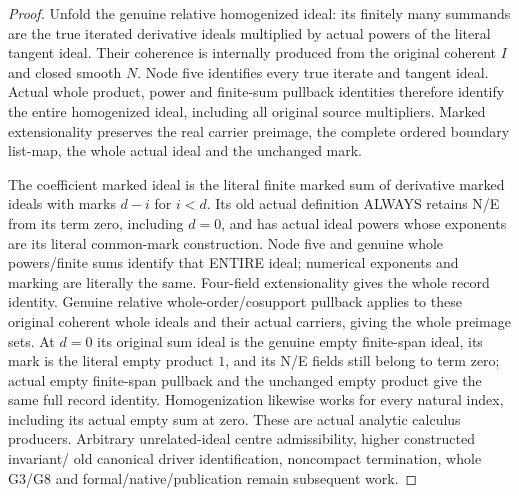 \begin{proof}
Unfold the genuine relative homogenized ideal: its finitely many summands
are the true iterated derivative ideals multiplied by actual powers of the
literal tangent ideal. Their coherence is internally produced from the
original coherent $I$ and closed smooth $N$. Node five identifies every true
iterate and tangent ideal. Actual whole product, power and finite-sum
pullback identities therefore identify the entire homogenized ideal, including
all original source multipliers. Marked extensionality preserves the real
carrier preimage, the complete ordered boundary list-map, the whole actual
ideal and the unchanged mark.

The coefficient marked ideal is the literal finite marked sum of derivative
marked ideals with marks $d-i$ for $i<d$. Its old actual definition ALWAYS
retains N/E from its term zero, including $d=0$, and has actual ideal powers
whose exponents are its literal common-mark construction. Node five and genuine whole powers/finite
sums identify that ENTIRE ideal; numerical exponents and marking are literally
the same. Four-field extensionality gives the whole record identity. Genuine
relative whole-order/cosupport pullback applies to these original coherent
whole ideals and their actual carriers, giving the whole preimage sets.
At $d=0$ its original sum ideal is the genuine empty finite-span ideal, its
mark is the literal empty product $1$, and its N/E fields still belong to term
zero; actual empty finite-span pullback and the unchanged empty product give
the same full record identity. Homogenization likewise works for every natural
index, including its actual empty sum at zero. These are actual analytic calculus producers.
Arbitrary unrelated-ideal centre admissibility, higher constructed invariant/
old canonical driver identification, noncompact termination, whole G3/G8 and
formal/native/publication remain subsequent work.
\end{proof}
